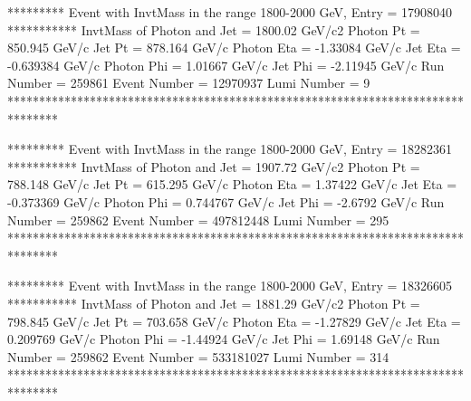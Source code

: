                                                                      
********* Event with InvtMass in the range 1800-2000 GeV, Entry = 17908040 ***********
InvtMass of Photon and Jet = 1800.02 GeV/c2
Photon Pt = 850.945 GeV/c
Jet Pt = 878.164 GeV/c
Photon Eta = -1.33084 GeV/c
Jet Eta = -0.639384 GeV/c
Photon Phi = 1.01667 GeV/c
Jet Phi = -2.11945 GeV/c
Run Number = 259861
Event Number = 12970937
Lumi Number = 9
********************************************************************************
                                                                     
                                                                     
********* Event with InvtMass in the range 1800-2000 GeV, Entry = 18282361 ***********
InvtMass of Photon and Jet = 1907.72 GeV/c2
Photon Pt = 788.148 GeV/c
Jet Pt = 615.295 GeV/c
Photon Eta = 1.37422 GeV/c
Jet Eta = -0.373369 GeV/c
Photon Phi = 0.744767 GeV/c
Jet Phi = -2.6792 GeV/c
Run Number = 259862
Event Number = 497812448
Lumi Number = 295
********************************************************************************
                                                                     
                                                                     
********* Event with InvtMass in the range 1800-2000 GeV, Entry = 18326605 ***********
InvtMass of Photon and Jet = 1881.29 GeV/c2
Photon Pt = 798.845 GeV/c
Jet Pt = 703.658 GeV/c
Photon Eta = -1.27829 GeV/c
Jet Eta = 0.209769 GeV/c
Photon Phi = -1.44924 GeV/c
Jet Phi = 1.69148 GeV/c
Run Number = 259862
Event Number = 533181027
Lumi Number = 314
********************************************************************************
                                                                     
